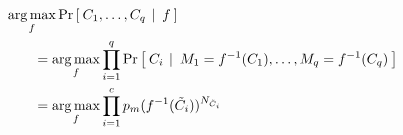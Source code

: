 \begin{align*}
  &\argmax_f \CondProb{C_1,\ldots,C_q}{f} \\
  &\myInd\myInd  = \argmax_f \prod_{i=1}^q \CondProb{C_i}{M_1 = f^{-1}(C_1),\ldots,M_q = f^{-1}(C_q)}\\
  &\myInd\myInd = \argmax_f \prod_{i=1}^{c} \mdist(f^{-1}(\tilde{C}_i))^{N_{\tilde{C}_i}}
\end{align*}




		
		








